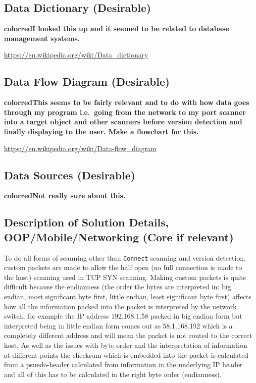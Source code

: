 \documentclass[titlepage]{article}
\begin{document}
\subsection{Data Dictionary (Desirable)}

\textbf{color{red}{I looked this up and it seemed to be related to database management systems.}}

\href{https://en.wikipedia.org/wiki/Data_dictionary}{https://en.wikipedia.org/wiki/Data\_dictionary}

\subsection{Data Flow Diagram (Desirable)}

\textbf{color{red}{This seems to be fairly relevant and to do with how data goes through my program
    i.e.\ going from the network to my port scanner into a target object and other scanners
before version detection and finally displaying to the user. Make a flowchart for this.}}

\href{https://en.wikipedia.org/wiki/Data-flow_diagram<Paste>}{https://en.wikipedia.org/wiki/Data-flow\_diagram}

\subsection{Data Sources (Desirable)}

\textbf{color{red}{Not really sure about this.}}

\subsection{Description of Solution Details, OOP/Mobile/Networking (Core if relevant)}

To do all forms of scanning other than \verb|Connect| scanning and version detection, custom
packets are made to allow the half open (no full connection is made to the host) scanning
used in TCP SYN scanning. Making custom packets is quite difficult because the endianness
(the order the bytes are interpreted in: big endian, most significant byte first, little endian,
least significant byte first) affects how all the information packed into the packet is interpreted
by the network switch, for example the IP address 192.168.1.58 packed in big endian form but interpreted
being in little endian form comes out as 58.1.168.192 which is a completely different address and
will mean the packet is not routed to the correct host. As well as the issues with byte order
and the interpretation of information at different points the checksum which is embedded into
the packet is calculated from a psuedo-header calculated from information in the underlying
IP header and all of this has to be calculated in the right byte order (endianness).
\end{document}

